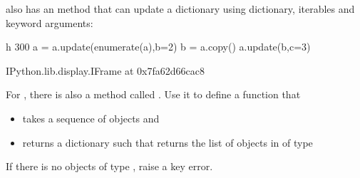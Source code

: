 \documentclass[letterpaper,10pt,english]{sphinxmanual}
\begin{document}
 also has an  method that can update a dictionary using dictionary, iterables and keyword arguments:

\begin{sphinxVerbatim}[commandchars=\\\{\}]
 \PYGZhy{}h 300
a = \PYGZob{}\PYGZcb{}
a.update(enumerate(\PYGZsq{}a\PYGZsq{}),b=2)
b = a.copy()
a.update(b,c=3)
\end{sphinxVerbatim}

\begin{sphinxVerbatim}[commandchars=\\\{\}]
\PYGZlt{}IPython.lib.display.IFrame at 0x7fa62d66cac8\PYGZgt{}
\end{sphinxVerbatim}

 For , there is also a method called . Use it to define a function  that
\begin{itemize}
\item {} 
takes a sequence  of objects and

\item {} 
returns a dictionary  such that  returns the list of objects in  of type 

\end{itemize}

If there is no objects of type , raise a key error.
\end{document}
